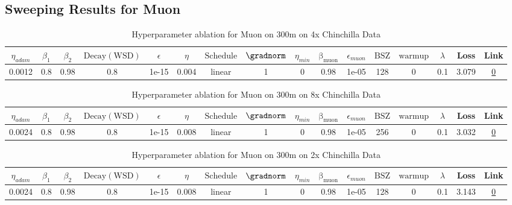 \subsection{Sweeping Results for Muon}%
\begin{table}[H]
\centering
\caption{Hyperparameter ablation for Muon on 300m on 4x Chinchilla Data}
\label{tab:ablation_muon_300m_4}
\begin{tabular}{cccccccccccccccc}
\toprule
$\eta_{adam}$ & $\beta_1$ & $\beta_2$ & $\mathrm{Decay (WSD)}$ & $\epsilon$ & $\eta$ & $\mathrm{Schedule}$ & $\gradnorm$ & $\eta_{min}$ & $\mathrm{\beta_{muon}}$ & $\epsilon_{muon}$ & $\mathrm{BSZ}$ & $\mathrm{warmup}$ & $\lambda$ & Loss & Link \\
\midrule
0.0012 & 0.8 & 0.98 & 0.8 & 1e-15 & 0.004 & linear & 1 & 0 & 0.98 & 1e-05 & 128 & 0 & 0.1 & 3.079 & \href{https://wandb.ai/stanford-mercury/optimizer-scaling/runs/sweep-300m-24B-muon25115alr0.004-wd0.1-minlr0-warmup0-b10.8-b20.-f7ddef}{0} \\
\midrule
\bottomrule
\end{tabular}
\end{table}

\begin{table}[H]
\centering
\caption{Hyperparameter ablation for Muon on 300m on 8x Chinchilla Data}
\label{tab:ablation_muon_300m_8}
\begin{tabular}{cccccccccccccccc}
\toprule
$\eta_{adam}$ & $\beta_1$ & $\beta_2$ & $\mathrm{Decay (WSD)}$ & $\epsilon$ & $\eta$ & $\mathrm{Schedule}$ & $\gradnorm$ & $\eta_{min}$ & $\mathrm{\beta_{muon}}$ & $\epsilon_{muon}$ & $\mathrm{BSZ}$ & $\mathrm{warmup}$ & $\lambda$ & Loss & Link \\
\midrule
0.0024 & 0.8 & 0.98 & 0.8 & 1e-15 & 0.008 & linear & 1 & 0 & 0.98 & 1e-05 & 256 & 0 & 0.1 & 3.032 & \href{https://wandb.ai/stanford-mercury/optimizer-scaling/runs/sweep-300m-48B-muond28b65lr0.008-wd0.1-minlr0-warmup0-b10.8-b20.-3e14c1}{0} \\
\midrule
\bottomrule
\end{tabular}
\end{table}

\begin{table}[H]
\centering
\caption{Hyperparameter ablation for Muon on 300m on 2x Chinchilla Data}
\label{tab:ablation_muon_300m_2}
\begin{tabular}{cccccccccccccccc}
\toprule
$\eta_{adam}$ & $\beta_1$ & $\beta_2$ & $\mathrm{Decay (WSD)}$ & $\epsilon$ & $\eta$ & $\mathrm{Schedule}$ & $\gradnorm$ & $\eta_{min}$ & $\mathrm{\beta_{muon}}$ & $\epsilon_{muon}$ & $\mathrm{BSZ}$ & $\mathrm{warmup}$ & $\lambda$ & Loss & Link \\
\midrule
0.0024 & 0.8 & 0.98 & 0.8 & 1e-15 & 0.008 & linear & 1 & 0 & 0.98 & 1e-05 & 128 & 0 & 0.1 & 3.143 & \href{https://wandb.ai/stanford-mercury/optimizer-scaling/runs/sweep-300m-12B-muon5de1eclr0.008-wd0.1-minlr0-warmup0-b10.8-b20.-049a9e}{0} \\
\midrule
\bottomrule
\end{tabular}
\end{table}

